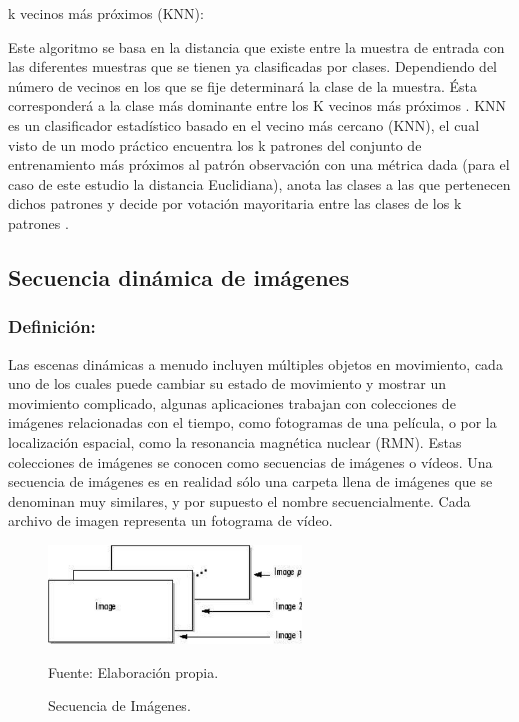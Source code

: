\begin{enumerate}
{\bf \item k vecinos más próximos (KNN):} \skip 0.1cm
Este algoritmo se basa en la distancia que existe entre la muestra de entrada con las diferentes muestras que se tienen ya clasificadas por clases. Dependiendo del número de vecinos en los que se fije determinará la clase de la muestra. Ésta corresponderá a la clase más dominante entre los K vecinos más próximos \citep{Bartual}. 
\vskip 0.1cm
KNN es un clasificador estadístico basado en el vecino más cercano (KNN), el cual visto de un modo práctico encuentra los k patrones del conjunto de entrenamiento más próximos al patrón observación con una métrica dada (para el caso de este estudio la distancia Euclidiana), anota las clases a las que pertenecen dichos patrones y decide por votación mayoritaria entre las clases de los k patrones \citep{Damian}.
\end{enumerate}

\subsection{Secuencia dinámica de imágenes}
\subsubsection{Definición:}
Las escenas dinámicas a menudo incluyen múltiples objetos en movimiento, cada uno de los cuales puede cambiar su estado de movimiento y mostrar un movimiento complicado, algunas aplicaciones trabajan con colecciones de imágenes relacionadas con el tiempo, como fotogramas de una película, o por la localización espacial, como la resonancia magnética nuclear (RMN). Estas colecciones de imágenes se conocen como secuencias de imágenes o vídeos.
\vskip 0.1cm
Una secuencia de imágenes es en realidad sólo una carpeta llena de imágenes que se denominan muy similares, y por supuesto el nombre secuencialmente. Cada archivo de imagen representa un fotograma de vídeo.

\begin{figure}[ht]
\begin{center}
\includegraphics[width=0.6\textwidth]{Imagen25}
\end{center}
\begin{center}
\vskip -0.5cm
\caption{\small{Secuencia de Imágenes.}}
{\small{Fuente: Elaboración propia.}}
\end{center}
\end{figure}


